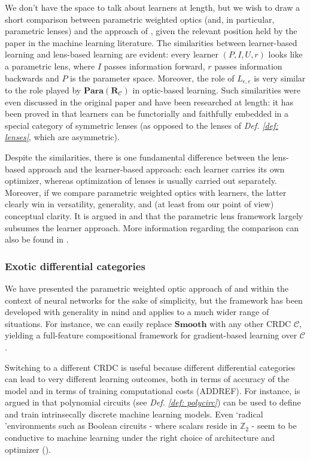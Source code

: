 \documentclass[12pt,a4paper,openright,twoside]{report}
\theoremstyle{plain}
\theoremstyle{definition}
\begin{document}
We don't have the space to talk about learners at length, but we wish to draw a short comparison between parametric weighted optics (and, in particular, parametric lenses) and the approach of \cite{fong2019backprop}, given the relevant position held by the paper in the machine learning literature. The similarities between learner-based learning and lens-based learning are evident: every learner $(P, I, U, r)$ looks like a parametric lens, where $I$ passes information forward, $r$ passes information backwards and $P$ is the parameter space. Moreover, the role of $L_{\epsilon, e}$ is very similar to the role played by $\mathbf{Para}(\mathbf{R}_{\mathcal{C}})$ in optic-based learning. Such similarities were even discussed in the original paper \cite{fong2019backprop} and have been researched at length: it has been proved in \cite{fong2019lenses} that learners can be functorially and faithfully embedded in a special category of symmetric lenses (as opposed to the lenses of \textit{Def. \ref{def: lenses}}, which are asymmetric).


Despite the similarities, there is one fundamental difference between the lens-based approach and the learner-based approach: each learner carries its own optimizer, whereas optimization of lenses is usually carried out separately. Moreover, if we compare parametric weighted optics with learners, the latter clearly win in versatility, generality, and (at least from our point of view) conceptual clarity. It is argued in \cite{shiebler2021category} and \cite{cruttwell2022categorical} that the parametric lens framework largely subsumes the learner approach. More information regarding the comparison can also be found in \cite{gavranovic2024fundamental}.


\subsubsection{Exotic differential categories}

We have presented the parametric weighted optic approach of \cite{gavranovic2024fundamental} and \cite{cruttwell2022categorical} within the context of neural networks for the sake of simplicity, but the framework has been developed with generality in mind and applies to a much wider range of situations. For instance, we can easily replace $\mathbf{Smooth}$ with any other CRDC $\mathcal{C}$, yielding a full-feature compositional framework for gradient-based learning over $\mathcal{C}$.


Switching to a different CRDC is useful because different differential categories can lead to very different learning outcomes, both in terms of accuracy of the model and in terms of training computational costs (ADDREF).
For instance, is argued in \cite{wilson2022categories} that polynomial circuits (see \textit{Def. \ref{def: polycirc}}) can be used to define and train intrinsecally discrete machine learning models. Even \lq radical \rq environments such as Boolean circuits - where scalars reside in $\mathbb{Z}_2$ - seem to be conductive to machine learning under the right choice of architecture and optimizer (\cite{wilson2021reverse}).
\end{document}
